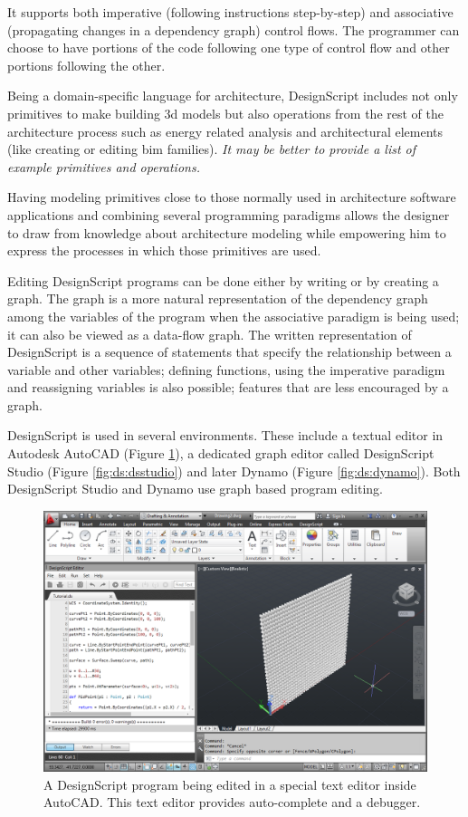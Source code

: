 \documentclass{./llncs2e/llncs}
\begin{document}
	It supports both imperative (following instructions step-by-step) and associative (propagating changes in a dependency graph) control flows. The programmer can choose to have portions of the code following one type of control flow and other portions following the other.

	Being a domain-specific language for architecture, DesignScript includes not only primitives to make building 3d models but also operations from the rest of the architecture process such as energy related analysis and architectural elements (like creating or editing \ac{bim} families).
	\emph{It may be better to provide a list of example primitives and operations.}

	Having modeling primitives close to those normally used in architecture software applications and combining several programming paradigms allows the designer to draw from knowledge about architecture modeling while empowering him to express the processes in which those primitives are used.

	Editing DesignScript programs can be done either by writing or by creating a graph. The graph is a more natural representation of the dependency graph among the variables of the program when the associative paradigm is being used; it can also be viewed as a data-flow graph. The written representation of DesignScript is a sequence of statements that specify the relationship between a variable and other variables; defining functions, using the imperative paradigm and reassigning variables is also possible; features that are less encouraged by a graph.

	DesignScript is used in several environments. These include a textual editor in Autodesk AutoCAD (Figure \ref{fig:ds:autocad}), a dedicated graph editor called DesignScript Studio (Figure \ref{fig:ds:dsstudio}) and later Dynamo (Figure \ref{fig:ds:dynamo}). Both DesignScript Studio and Dynamo use graph based program editing.

	\begin{figure}
	  \centering
	  \includegraphics[width=1.0\textwidth]{img/ds_autocad}
	    \caption{A DesignScript program being edited in a special text editor inside AutoCAD. This text editor provides auto-complete and a debugger.}
	  \label{fig:ds:autocad}
	\end{figure} 
\end{document}
